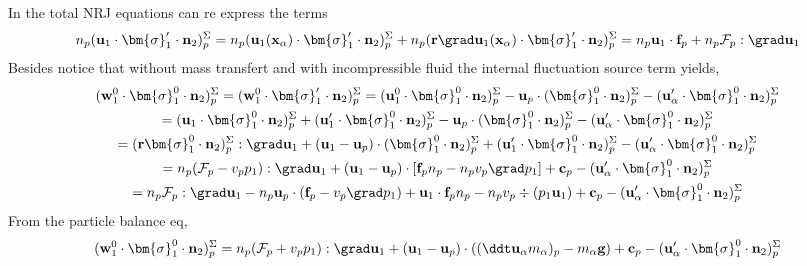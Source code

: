 In the total NRJ equations can re express the terms 
\begin{multline*}
    n_p (\textbf{u}_1 \cdot \bm{\sigma}_1' \cdot  \textbf{n}_2)^\Sigma_p
    = 
    n_p (\textbf{u}_1(\textbf{x}_\alpha) \cdot \bm{\sigma}_1' \cdot  \textbf{n}_2)^\Sigma_p
    + n_p (\textbf{r}\grad\textbf{u}_1(\textbf{x}_\alpha) \cdot \bm{\sigma}_1' \cdot  \textbf{n}_2)^\Sigma_p
    =n_p \textbf{u}_1 \cdot \textbf{f}_p
    + n_p \mathcal{F}_p :\grad \textbf{u}_1
\end{multline*}
Besides notice that without mass transfert and with incompressible fluid the internal fluctuation source term yields,
\begin{multline*}
    (\textbf{w}_1^0 \cdot \bm{\sigma}_1^0 \cdot  \textbf{n}_2)^\Sigma_p
    =   
    (\textbf{w}_1^0 \cdot \bm{\sigma}_1' \cdot  \textbf{n}_2)^\Sigma_p
    =   
    (\textbf{u}_1^0 \cdot \bm{\sigma}_1^0 \cdot  \textbf{n}_2)^\Sigma_p
    - \textbf{u}_p \cdot (\bm{\sigma}_1^0 \cdot  \textbf{n}_2)^\Sigma_p
    - (\textbf{u}_\alpha' \cdot \bm{\sigma}_1^0 \cdot  \textbf{n}_2)^\Sigma_p\\
    =   
    (\textbf{u}_1 \cdot \bm{\sigma}_1^0 \cdot  \textbf{n}_2)^\Sigma_p
    + (\textbf{u}_1' \cdot \bm{\sigma}_1^0 \cdot  \textbf{n}_2)^\Sigma_p
    - \textbf{u}_p \cdot (\bm{\sigma}_1^0 \cdot  \textbf{n}_2)^\Sigma_p
    - (\textbf{u}_\alpha' \cdot \bm{\sigma}_1^0 \cdot  \textbf{n}_2)^\Sigma_p\\
    =   
    (\textbf{r}\bm{\sigma}_1^0 \cdot  \textbf{n}_2)^\Sigma_p : \grad \textbf{u}_1+
    (\textbf{u}_1 - \textbf{u}_p) \cdot (\bm{\sigma}_1^0 \cdot  \textbf{n}_2)^\Sigma_p
    + (\textbf{u}_1' \cdot \bm{\sigma}_1^0 \cdot  \textbf{n}_2)^\Sigma_p
    - (\textbf{u}_\alpha' \cdot \bm{\sigma}_1^0 \cdot  \textbf{n}_2)^\Sigma_p\\
    =   
    n_p(\mathcal{F}_p - v_p p_1): \grad \textbf{u}_1+
    (\textbf{u}_1 - \textbf{u}_p) \cdot [\textbf{f}_pn_p - n_pv_p\grad p_1]
    + \textbf{c}_p
    - (\textbf{u}_\alpha' \cdot \bm{\sigma}_1^0 \cdot  \textbf{n}_2)^\Sigma_p\\
    =   
    n_p \mathcal{F}_p : \grad \textbf{u}_1
    - n_p \textbf{u}_p \cdot (\textbf{f}_p - v_p\grad p_1)
    + \textbf{u}_1  \cdot \textbf{f}_pn_p 
    - n_pv_p \div (p_1 \textbf{u}_1)
    + \textbf{c}_p
    - (\textbf{u}_\alpha' \cdot \bm{\sigma}_1^0 \cdot  \textbf{n}_2)^\Sigma_p\\
\end{multline*}
From the particle balance eq, 
\begin{equation}
    (\textbf{w}_1^0 \cdot \bm{\sigma}_1^0 \cdot  \textbf{n}_2)^\Sigma_p
    =
    n_p(\mathcal{F}_p + v_p p_1): \grad \textbf{u}_1+
    (\textbf{u}_1 - \textbf{u}_p) \cdot ((\ddt \textbf{u}_\alpha m_\alpha)_p - m_\alpha \textbf{g})
    + \textbf{c}_p
    - (\textbf{u}_\alpha' \cdot \bm{\sigma}_1^0 \cdot  \textbf{n}_2)^\Sigma_p\\
\end{equation}


